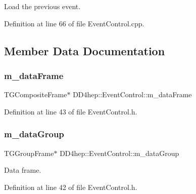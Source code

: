 Load the previous event. 



Definition at line 66 of file Event\+Control.\+cpp.



\subsection{Member Data Documentation}
\hypertarget{class_d_d4hep_1_1_event_control_aee2bb0377218bcfbad0fc757ffd926cb}{}\label{class_d_d4hep_1_1_event_control_aee2bb0377218bcfbad0fc757ffd926cb} 
\subsubsection{\texorpdfstring{m\+\_\+data\+Frame}{m\_dataFrame}}
{\footnotesize\ttfamily T\+G\+Composite\+Frame$\ast$ D\+D4hep\+::\+Event\+Control\+::m\+\_\+data\+Frame\hspace{0.3cm}{\ttfamily [private]}}



Definition at line 43 of file Event\+Control.\+h.

\hypertarget{class_d_d4hep_1_1_event_control_af0528badfa37dba89e2d73c83f246e08}{}\label{class_d_d4hep_1_1_event_control_af0528badfa37dba89e2d73c83f246e08} 
\subsubsection{\texorpdfstring{m\+\_\+data\+Group}{m\_dataGroup}}
{\footnotesize\ttfamily T\+G\+Group\+Frame$\ast$ D\+D4hep\+::\+Event\+Control\+::m\+\_\+data\+Group\hspace{0.3cm}{\ttfamily [private]}}



Data frame. 



Definition at line 42 of file Event\+Control.\+h.

\hypertarget{class_d_d4hep_1_1_event_control_ad9786c7cb28b2c715ba6343a2c62362a}{}\label{class_d_d4hep_1_1_event_control_ad9786c7cb28b2c715ba6343a2c62362a} 
